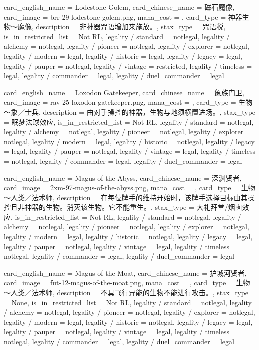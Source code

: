 \documentclass[lang = cn, color = black, 10pt]{AllThatStax}
\begin{document}
\card
{
	card_english_name = {Lodestone Golem},
	card_chinese_name = {磁石魔像},
	card_image = brr-29-lodestone-golem.png,
	mana_cost = ,
	card_type = 神器生物～魔像,
	description = {非神器咒语增加来施放。},
	stax_type = 咒语税,
	is_in_restricted_list = Not RL,
	legality / standard = notlegal,
	legality / alchemy = notlegal,
	legality / pioneer = notlegal,
	legality / explorer = notlegal,
	legality / modern = legal,
	legality / historic = legal,
	legality / legacy = legal,
	legality / pauper = notlegal,
	legality / vintage = restricted,
	legality / timeless = legal,
	legality / commander = legal,
	legality / duel_commander = legal
}

\card
{
	card_english_name = {Loxodon Gatekeeper},
	card_chinese_name = {象族门卫},
	card_image = rav-25-loxodon-gatekeeper.png,
	mana_cost = ,
	card_type = 生物～象／士兵,
	description = {由对手操控的神器，生物与地须横置进场。},
	stax_type = 眠梦法球效应,
	is_in_restricted_list = Not RL,
	legality / standard = notlegal,
	legality / alchemy = notlegal,
	legality / pioneer = notlegal,
	legality / explorer = notlegal,
	legality / modern = legal,
	legality / historic = notlegal,
	legality / legacy = legal,
	legality / pauper = notlegal,
	legality / vintage = legal,
	legality / timeless = notlegal,
	legality / commander = legal,
	legality / duel_commander = legal
}

\card
{
	card_english_name = {Magus of the Abyss},
	card_chinese_name = {深渊贤者},
	card_image = 2xm-97-magus-of-the-abyss.png,
	mana_cost = ,
	card_type = 生物 ～人类／法术师,
	description = {在每位牌手的维持开始时，该牌手选择目标由其操控且非神器的生物。消灭该生物。它不能重生。},
	stax_type = 大礼拜堂/烟囱效应,
	is_in_restricted_list = Not RL,
	legality / standard = notlegal,
	legality / alchemy = notlegal,
	legality / pioneer = notlegal,
	legality / explorer = notlegal,
	legality / modern = legal,
	legality / historic = notlegal,
	legality / legacy = legal,
	legality / pauper = notlegal,
	legality / vintage = legal,
	legality / timeless = notlegal,
	legality / commander = legal,
	legality / duel_commander = legal
}

\card
{
	card_english_name = {Magus of the Moat},
	card_chinese_name = {护城河贤者},
	card_image = fut-12-magus-of-the-moat.png,
	mana_cost = ,
	card_type = 生物～人类／法术师,
	description = {不具飞行异能的生物不能进行攻击。},
	stax_type = None,
	is_in_restricted_list = Not RL,
	legality / standard = notlegal,
	legality / alchemy = notlegal,
	legality / pioneer = notlegal,
	legality / explorer = notlegal,
	legality / modern = legal,
	legality / historic = notlegal,
	legality / legacy = legal,
	legality / pauper = notlegal,
	legality / vintage = legal,
	legality / timeless = notlegal,
	legality / commander = legal,
	legality / duel_commander = legal
}
\end{document}
